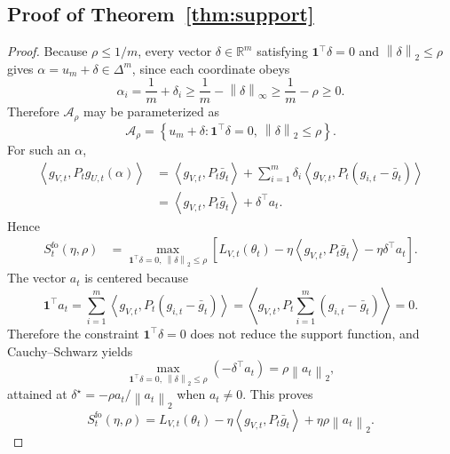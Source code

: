 \documentclass{article}
\newcommand{\RR}{\mathbb{R}}
\newcommand{\simplex}{\Delta}
\newcommand{\norm}[1]{\left\lVert #1 \right\rVert}
\newcommand{\inner}[2]{\left\langle #1, #2 \right\rangle}
\begin{document}
\subsection{Proof of Theorem~\ref{thm:support}}

\begin{proof}
Because $\rho \le 1/m$, every vector $\delta \in \RR^m$ satisfying $\mathbf{1}^\top \delta = 0$ and $\norm{\delta}_2 \le \rho$ gives $\alpha = u_m + \delta \in \simplex^m$, since each coordinate obeys
\begin{equation}
    \alpha_i = \frac{1}{m} + \delta_i \ge \frac{1}{m} - \norm{\delta}_\infty \ge \frac{1}{m} - \rho \ge 0.
\end{equation}
Therefore $\mathcal{A}_{\rho}$ may be parameterized as
\begin{equation}
    \mathcal{A}_{\rho}
    =
    \left\{
    u_m + \delta :
    \mathbf{1}^\top \delta = 0,\ \norm{\delta}_2 \le \rho
    \right\}.
\end{equation}
For such an $\alpha$,
\begin{align}
    \inner{g_{V,t}}{P_t g_{U,t}(\alpha)}
    &=
    \inner{g_{V,t}}{P_t \bar g_t}
    +
    \sum_{i=1}^{m}\delta_i \inner{g_{V,t}}{P_t(g_{i,t}-\bar g_t)} \\
    &=
    \inner{g_{V,t}}{P_t \bar g_t} + \delta^\top a_t.
\end{align}
Hence
\begin{align}
    S_t^{\mathrm{fo}}(\eta,\rho)
    &=
    \max_{\mathbf{1}^\top \delta = 0,\ \norm{\delta}_2 \le \rho}
    \left[
    L_{V,t}(\theta_t)
    -
    \eta \inner{g_{V,t}}{P_t \bar g_t}
    -
    \eta \delta^\top a_t
    \right].
\end{align}
The vector $a_t$ is centered because
\begin{equation}
    \mathbf{1}^\top a_t
    =
    \sum_{i=1}^{m}\inner{g_{V,t}}{P_t(g_{i,t}-\bar g_t)}
    =
    \inner{g_{V,t}}{P_t\sum_{i=1}^{m}(g_{i,t}-\bar g_t)}
    = 0.
\end{equation}
Therefore the constraint $\mathbf{1}^\top \delta = 0$ does not reduce the support function, and Cauchy--Schwarz yields
\begin{equation}
    \max_{\mathbf{1}^\top \delta = 0,\ \norm{\delta}_2 \le \rho} (-\delta^\top a_t)
    =
    \rho \norm{a_t}_2,
\end{equation}
attained at $\delta^\star = -\rho a_t / \norm{a_t}_2$ when $a_t \neq 0$.
This proves
\begin{equation}
    S_t^{\mathrm{fo}}(\eta,\rho)
    =
    L_{V,t}(\theta_t)
    -
    \eta \inner{g_{V,t}}{P_t \bar g_t}
    +
    \eta \rho \norm{a_t}_2.
\end{equation}


\end{proof}
\end{document}
